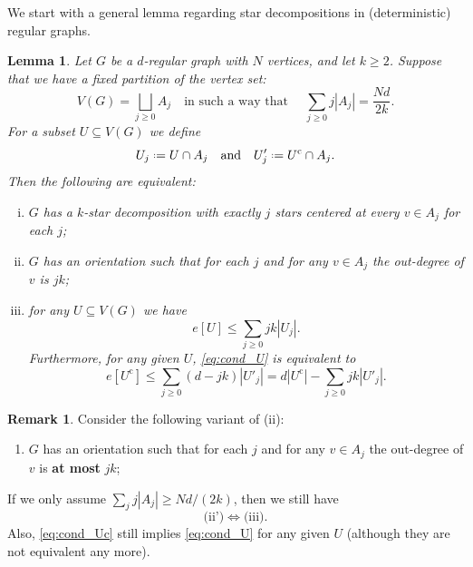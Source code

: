 \documentclass[12pt]{amsart}
\newtheorem{lemma}[theorem]{Lemma}
\theoremstyle{definition}
\newtheorem{remark}[theorem]{Remark}
\newcommand\comp{\mathrm{c}}
\newcommand{\defeq}{\mathrel{\vcenter{\baselineskip0.5ex \lineskiplimit0pt
                     \hbox{\scriptsize.}\hbox{\scriptsize.}}}%
                     =}
\begin{document}
We start with a general lemma regarding star decompositions in (deterministic) regular graphs.
%
\begin{lemma} \label{lem:gen_sd}
Let $G$ be a $d$-regular graph with $N$ vertices, and let $k \geq 2$. Suppose that we have a fixed partition of the vertex set:
%
\[ V(G)= \bigsqcup_{j \geq 0} A_j 
\quad \text{in such a way that } \quad 
\sum_{j \geq 0} j |A_j| = \frac{Nd}{2k} . \]
%
For a subset $U \subseteq V(G)$ we define 
%
\[ U_j \defeq U \cap A_j 
\quad \text{and} \quad U'_j \defeq U^\comp \cap A_j .\]
%
Then the following are equivalent:
%
\begin{enumerate}[(i)]
\item $G$ has a $k$-star decomposition with exactly $j$ stars centered at every $v \in A_j$ for each $j$;
\item $G$ has an orientation such that for each $j$ and for any $v \in A_j$ the out-degree of $v$ is $jk$;
\item for any $U \subseteq V(G)$ we have 
%
\begin{equation} \label{eq:cond_U}
e[U] \leq \sum_{j \geq 0} jk |U_j| .
\end{equation}
%
Furthermore, for any given $U$, \eqref{eq:cond_U} is equivalent to 
\begin{equation} \label{eq:cond_Uc}
e[U^\comp] \leq  \sum_{j \geq 0} (d-jk) |U'_j| 
= d |U^\comp| - \sum_{j \geq 0} jk |U'_j|.
\end{equation}
%
\end{enumerate}
%
\end{lemma}
%
\begin{remark}
Consider the following variant of (ii):
%
\begin{enumerate}
\item[(ii')] $G$ has an orientation such that for each $j$ and for any $v \in A_j$ the out-degree of $v$ is \textbf{at most} $jk$;
\end{enumerate}
%
If we only assume $\sum_j j |A_j| \geq Nd/(2k)$, then we still have 
\[ \text{(ii')} 
\Leftrightarrow \text{(iii)} .\] 
Also, \eqref{eq:cond_Uc} still implies \eqref{eq:cond_U} for any given $U$ (although they are not equivalent any more).
\end{remark}
%
\end{document}
